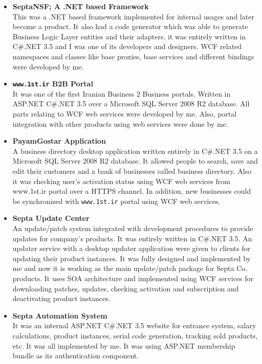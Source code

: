 \documentclass[12pt,a4paper]{article}
\begin{document}
\begin{itemize}
\begin{itemize}
				\item \small \textbf{SeptaNSF; A .NET based Framework} \\
				This was a .NET based framework implemented for internal usages and later become a product. It also had a code generator which was able to generate Business Logic Layer entities and their adapters. it was entirely written in C\#.NET 3.5 and I was one of its developers and designers. WCF related namespaces and classes like base proxies, base services and different bindings were developed by me. \\
				\item \small \textbf{\texttt{www.1st.ir} B2B Portal} \\
				It was one of the first Iranian Business 2 Business portals. Written in ASP.NET C\#.NET 3.5 over a Microsoft SQL Server 2008 R2 database. All parts relating to WCF web services were developed by me. Also, portal integration with other products using web services were done by me. \\
				\item \small \textbf{PayamGostar Application} \\
				A business directory desktop application written entirely in C\#.NET 3.5 on a Microsoft SQL Server 2008 R2 database. It allowed people to search, save and edit their customers and a bank of businesses called business directory. Also it was checking user's activation status using WCF web services from www.1st.ir portal over a HTTPS channel. In addition, new businesses could be synchronized with \texttt{www.1st.ir} portal using WCF web services. \\
				\item \small \textbf{Septa Update Center} \\
				An update/patch system integrated with development procedures to provide updates for company's products. It was entirely written in C\#.NET 3.5. An updater service with a desktop updater application were given to clients for updating their product instances. It was fully designed and implemented by me and now it is working as the main update/patch package for Septa Co. products. It uses SOA architecture and implemented using WCF services for downloading patches, updates, checking activation and subscription and deactivating product instances. \\
				\item \small \textbf{Septa Automation System} \\
				It was an internal ASP.NET C\#.NET 3.5 website for entrance system, salary calculations, product instances, serial code generation, tracking sold products, etc. It was all implemented by me. It was using ASP.NET membership bundle as its authentication component.

\end{itemize}
\end{itemize}
\end{document}

